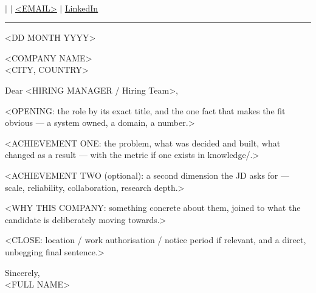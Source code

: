 \documentclass[letterpaper,10pt]{article}   %
\begin{document}
\begin{center}
    {\sffamily\bfseries{}} \\ \vspace{4pt}
     \quad $|$  \quad $|$ \quad
    \href{mailto:<EMAIL>}{\underline{<EMAIL>}} \quad $|$ \quad
    \href{https://www.linkedin.com/in/<HANDLE>/}{\underline{LinkedIn}}
\end{center}
\vspace{6pt}
\hrule
\vspace{14pt}

<DD MONTH YYYY>

\vspace{-4pt}
<COMPANY NAME> \\
<CITY, COUNTRY>

Dear <HIRING MANAGER / Hiring Team>,

<OPENING: the role by its exact title, and the one fact that makes the fit
obvious — a system owned, a domain, a number.>

<ACHIEVEMENT ONE: the problem, what was decided and built, what changed as a
result — with the metric if one exists in knowledge/.>

<ACHIEVEMENT TWO (optional): a second dimension the JD asks for — scale,
reliability, collaboration, research depth.>

<WHY THIS COMPANY: something concrete about them, joined to what the candidate is
deliberately moving towards.>

<CLOSE: location / work authorisation / notice period if relevant, and a direct,
unbegging final sentence.>

\vspace{10pt}
Sincerely, \\[6pt]     %
<FULL NAME>

\end{document}
